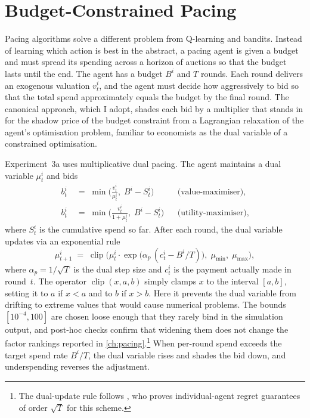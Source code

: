 \section{Budget-Constrained Pacing}
\label{sec:pacing}

Pacing algorithms solve a different problem from Q-learning and bandits. Instead of learning which action is best in the abstract, a pacing agent is given a budget and must spread its spending across a horizon of auctions so that the budget lasts until the end. The agent has a budget $B^i$ and $T$ rounds. Each round delivers an exogenous valuation $v_t^i$, and the agent must decide how aggressively to bid so that the total spend approximately equals the budget by the final round. The canonical approach, which I adopt, shades each bid by a multiplier that stands in for the shadow price of the budget constraint from a Lagrangian relaxation of the agent's optimisation problem, familiar to economists as the dual variable of a constrained optimisation.

Experiment~3a uses multiplicative dual pacing. The agent maintains a dual variable $\mu_t^i$ and bids
\begin{align}
b_t^i \;&=\; \min\!\Big(\frac{v_t^i}{\mu_t^i},\; B^i - S_t^i\Big) & &\text{(value-maximiser),} \label{eq:bid_vmax}\\
b_t^i \;&=\; \min\!\Big(\frac{v_t^i}{1 + \mu_t^i},\; B^i - S_t^i\Big) & &\text{(utility-maximiser),} \label{eq:bid_umax}
\end{align}
where $S_t^i$ is the cumulative spend so far. After each round, the dual variable updates via an exponential rule
\begin{equation}
\mu_{t+1}^i \;=\; \operatorname{clip}\!\Big(\mu_t^i \cdot \exp\!\big(\alpha_p \, (c_t^i - B^i / T)\big),\; \mu_{\min},\; \mu_{\max}\Big),
\label{eq:ac_dual_update}
\end{equation}
where $\alpha_p = 1/\sqrt{T}$ is the dual step size and $c_t^i$ is the payment actually made in round~$t$. The operator $\operatorname{clip}(x, a, b)$ simply clamps $x$ to the interval $[a, b]$, setting it to $a$ if $x < a$ and to $b$ if $x > b$. Here it prevents the dual variable from drifting to extreme values that would cause numerical problems. The bounds $[10^{-4}, 100]$ are chosen loose enough that they rarely bind in the simulation output, and post-hoc checks confirm that widening them does not change the factor rankings reported in \cref{ch:pacing}.\footnote{The dual-update rule follows \citet{Balseiro2019Learning}, who proves individual-agent regret guarantees of order $\sqrt{T}$ for this scheme.} When per-round spend exceeds the target spend rate $B^i / T$, the dual variable rises and shades the bid down, and underspending reverses the adjustment.

